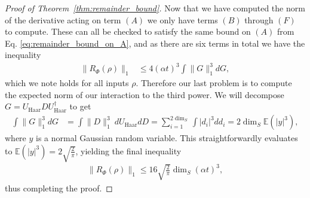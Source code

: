 \documentclass{article}
\newcommand{\matt}[1]{\todo[color=red!50, prepend, caption={Matt}, tickmarkheight=0.25cm]{#1}}
\newcommand{\abs}[1]{\left| #1 \right|}
\newcommand{\norm}[1]{\| #1 \|}
\begin{document}
\begin{proof}[Proof of Theorem~\ref{thm:remainder_bound}]
Now that we have computed the norm of the derivative acting on term $(A)$ we only have terms $(B)$ through $(F)$ to compute. These can all be checked to satisfy the same bound on $(A)$ from Eq. \eqref{eq:remainder_bound_on_A}, and as there are six terms in total we have the inequality
\begin{align}
    \norm{R_{\Phi}(\rho)}_1 &\le 4 (\alpha t)^3 \int \norm{G}_1^3 dG,
\end{align}
which we note holds for all inputs $\rho$. Therefore our last problem is to compute the expected norm of our interaction to the third power. We will decompose $G = U_{\text{Haar}} D U_{\text{Haar}}^\dagger $ to get
\begin{align}
    \int \norm{G}_1^3 dG &= \int \norm{D}_1^3 ~ dU_{\text{Haar}} dD = \sum_{i = 1}^{2 \dim_S} \int \abs{d_i}^3 dd_i = 2 \dim_S \mathbb{E}(\abs{y}^3),
\end{align}
where $y$ is a normal Gaussian random variable. This straightforwardly evaluates to $\mathbb{E}( |y|^3) = 2\sqrt{ \frac{2}{\pi}}$, yielding the final inequality
\begin{align}
    \norm{R_{\Phi}(\rho)}_1 \le 16 \sqrt{\frac{2}{\pi}} \dim_S (\alpha t)^3 ,
\end{align}
thus completing the proof.
\end{proof}
\end{document}

